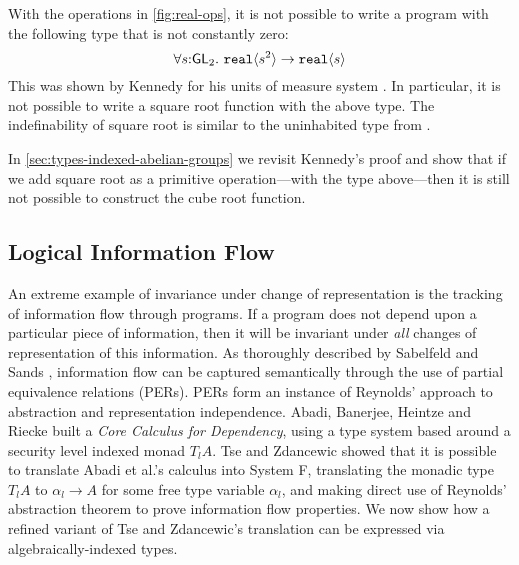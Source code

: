 \begin{example}
  With the operations in \autoref{fig:real-ops}, it is not possible to
  write a program with the following type that is not constantly zero:
  \begin{displaymath}
    \forall s \mathord: \SynGL{2}.\ \tyPrim{real}{s^2} \to \tyPrim{real}{s}
  \end{displaymath}
  This was shown by Kennedy for his units of measure system
  \cite{kennedy97relational}.  In particular, it is not possible to
  write a square root function with the above type. The indefinability
  of square root is similar to the uninhabited type from
  .

  In \autoref{sec:types-indexed-abelian-groups} we revisit Kennedy's
  proof and show that if we add square root as a primitive
  operation---with the type above---then it is still not possible to
  construct the cube root function.
\end{example}

\subsection{Logical Information Flow}
\label{sec:information-flow}

An extreme example of invariance under change of representation is the
tracking of information flow through programs. If a program does not
depend upon a particular piece of information, then it will be
invariant under \emph{all} changes of representation of this
information. As thoroughly described by Sabelfeld and Sands
\cite{sabelfeld01per}, information flow can be captured semantically
through the use of partial equivalence relations (PERs). PERs form an
instance of Reynolds' approach to abstraction and representation
independence. Abadi, Banerjee, Heintze and Riecke \cite{abadi99core}
built a \emph{Core Calculus for Dependency}, using a type system based
around a security level indexed monad $T_lA$. Tse and Zdancewic
\cite{tse04translating} showed that it is possible to translate Abadi
et al.'s calculus into System F, translating the monadic type $T_lA$
to $\alpha_l \to A$ for some free type variable $\alpha_l$, and making
direct use of Reynolds' abstraction theorem to prove information flow
properties. We now show how a refined variant of Tse and Zdancewic's
translation can be expressed via algebraically-indexed types.

